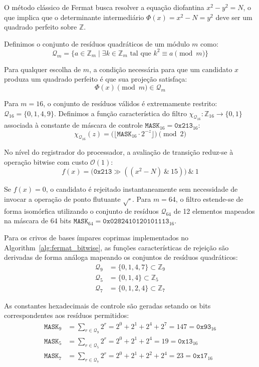 \documentclass[12pt,a4paper]{article}
\theoremstyle{plain}
\begin{document}
O método clássico de Fermat busca resolver a equação diofantina
$x^2 - y^2 = N$, o que implica que o determinante intermediário
$\Phi(x) = x^2 - N = y^2$ deve ser um quadrado perfeito sobre
$\mathbb{Z}$.

Definimos o conjunto de resíduos quadráticos de um módulo $m$ como:
\[
\mathcal{Q}_m = \{ a \in \mathbb{Z}_m \mid \exists k \in \mathbb{Z}_m
\text{ tal que } k^2 \equiv a \pmod m \}
\]

Para qualquer escolha de $m$, a condição necessária para que um
candidato $x$ produza um quadrado perfeito é que sua projeção satisfaça:
\[
\Phi(x) \pmod m \in \mathcal{Q}_m
\]

Para $m = 16$, o conjunto de resíduos válidos é extremamente restrito:
$\mathcal{Q}_{16} = \{0, 1, 4, 9\}$.  Definimos a função característica
do filtro $\chi_{\mathcal{Q}_{16}}: \mathbb{Z}_{16} \to \{0, 1\}$
associada à constante de máscara de controle
$\mathtt{MASK}_{16} = \mathtt{0x213}_{16}$:
\[
\chi_{\mathcal{Q}_{16}}(z) =
\bigl( \lfloor \mathtt{MASK}_{16} \cdot 2^{-z} \rfloor \bigr) \pmod 2
\]

No nível do registrador do processador, a avaliação de transição
reduz-se à operação bitwise com custo $\mathcal{O}(1)$:
\[
f(x) = \bigl( \mathtt{0x213} \gg ((x^2 - N) \ \& \ 15) \bigr) \ \& \ 1
\]

Se $f(x) = 0$, o candidato é rejeitado instantaneamente sem necessidade
de invocar a operação de ponto flutuante $\sqrt{\cdot}$.  Para $m = 64$,
o filtro estende-se de forma isomórfica utilizando o conjunto de resíduos
$\mathcal{Q}_{64}$ de 12 elementos mapeados na máscara de 64 bits
$\mathtt{MASK}_{64} = \mathtt{0x0282410120101113}_{16}$.

Para os crivos de bases ímpares coprimas implementados no
Algorithm~\ref{alg:fermat_bitwise}, as funções características de
rejeição são derivadas de forma análoga mapeando os conjuntos de
resíduos quadráticos:
\begin{align*}
\mathcal{Q}_{9} &= \{0, 1, 4, 7\} \subset \mathbb{Z}_9 \\
\mathcal{Q}_{5} &= \{0, 1, 4\} \subset \mathbb{Z}_5 \\
\mathcal{Q}_{7} &= \{0, 1, 2, 4\} \subset \mathbb{Z}_7
\end{align*}

As constantes hexadecimais de controle são geradas setando os bits
correspondentes aos resíduos permitidos:
\begin{align*}
\mathtt{MASK}_{9}  &= \sum_{r \in \mathcal{Q}_9} 2^r
  = 2^0 + 2^1 + 2^4 + 2^7 = 147 = \mathtt{0x93}_{16} \\
\mathtt{MASK}_{5}  &= \sum_{r \in \mathcal{Q}_5} 2^r
  = 2^0 + 2^1 + 2^4 = 19 = \mathtt{0x13}_{16} \\
\mathtt{MASK}_{7}  &= \sum_{r \in \mathcal{Q}_7} 2^r
  = 2^0 + 2^1 + 2^2 + 2^4 = 23 = \mathtt{0x17}_{16}
\end{align*}
\end{document}
